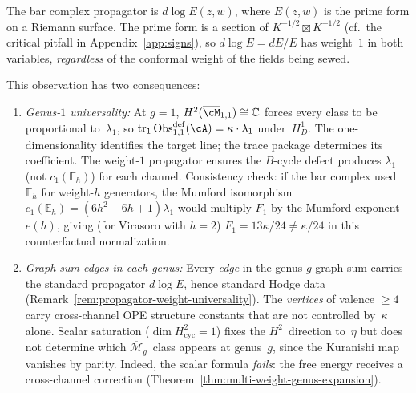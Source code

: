 \begin{remark}%
\label{rem:propagator-weight-universality}%
%
%
%
The bar complex propagator is $d\log E(z,w)$, where $E(z,w)$
is the prime form on a Riemann surface. The prime form is a
section of $K^{-1/2} \boxtimes K^{-1/2}$
(cf.\ the critical pitfall in Appendix~\ref{app:signs}),
so $d\log E = dE/E$ has weight~$1$ in both variables,
\emph{regardless} of the conformal weight of the fields being sewed.

This observation has two consequences:
\begin{enumerate}[label=\textup{(\roman*)}]
\item \emph{Genus-$1$ universality:}
At $g = 1$, $H^2(\overline{\cM}_{1,1}) \cong \mathbb{C}$ forces
every class to be proportional to~$\lambda_1$, so
$\operatorname{tr}_1\operatorname{Obs}^{\mathrm{def}}_{1,1}(\cA) = \kappa \cdot \lambda_1$
under~$H_D^1$.  The one-dimensionality identifies the target line;
the trace package determines its coefficient.
The weight-$1$ propagator ensures the $B$-cycle defect produces
$\lambda_1$ (not $c_1(\mathbb{E}_h)$) for each channel.
Consistency check: if the bar complex used
$\mathbb{E}_h$ for weight-$h$ generators, the Mumford
isomorphism $c_1(\mathbb{E}_h) = (6h^2{-}6h{+}1)\lambda_1$
would multiply $F_1$ by the Mumford exponent $e(h)$, giving
(for Virasoro with $h = 2$)
$F_1 = 13\kappa/24 \neq \kappa/24$
in this counterfactual normalization.
\item \emph{Graph-sum edges in each genus:}
Every \emph{edge} in the genus-$g$ graph sum carries the standard
propagator $d\log E$, hence standard Hodge data
(Remark~\ref{rem:propagator-weight-universality}).
The \emph{vertices} of valence $\geq 4$ carry cross-channel
OPE structure constants that are not controlled by~$\kappa$ alone.
Scalar saturation ($\dim H^2_{\mathrm{cyc}} = 1$) fixes the
$H^2$~direction to~$\eta$ but does not determine which
$\overline{\mathcal{M}}_g$~class appears at genus~$g$, since
the Kuranishi map vanishes by parity.
Indeed, the scalar formula \emph{fails}: the free energy receives
a cross-channel correction
(Theorem~\ref{thm:multi-weight-genus-expansion}).
\end{enumerate}
\end{remark}

